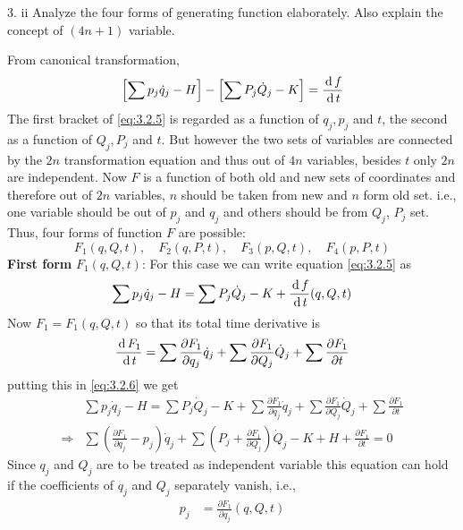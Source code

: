 \documentclass[12pt]{article}
\begin{document}
\begin{prob}{3. ii}
    Analyze the four forms of generating function elaborately. Also explain the concept of \((4n+1)\) variable.
\end{prob}
\begin{soln}
    From canonical transformation,
    \begin{equation}
        \left[ \sum p_j\dot{q}_j-H \right]-\left[ \sum P_j\dot{Q}_j-K \right]=\frac{\,\mathrm{d}\, f}{\,\mathrm{d}\, t} \label{eq:3.2.5}
    \end{equation}
    The first bracket of \eqref{eq:3.2.5} is regarded as a function of \(q_j,p_j\) and \(t\), the second as a function of \(Q_j,P_j\) and \(t\). But however the two sets of variables are connected by the \(2n\) transformation equation and thus out of \(4n\) variables, besides \(t\) only \(2n\) are independent. Now \(F\) is a function of both old and new sets of coordinates and therefore out of \(2n\) variables, \(n\) should be taken from new and \(n\) form old set. i.e., one variable should be out of \(p_j\) and \(q_j\) and others should be from \(Q_j\), \(P_j\) set. Thus, four forms of function \(F\) are possible:
    \[
        F_1(q,Q,t),\quad F_2(q,P,t),\quad F_3(p,Q,t),\quad F_4(p,P,t)
    \]
    \textbf{First form} \(F_1(q,Q,t)\): For this case we can write equation \eqref{eq:3.2.5} as
    \begin{equation}
        \sum p_j\dot{q}_j-H =\sum P_j\dot{Q}_j-K+\frac{\,\mathrm{d}\, f}{\,\mathrm{d}\, t}(q,Q,t) \label{eq:3.2.6}
    \end{equation} 
    Now \(F_1=F_1(q,Q,t)\) so that its total time derivative is
    \[\frac{\,\mathrm{d}\, F_1}{\,\mathrm{d}\, t}=\sum \frac{\partial F_1}{\partial q_j}\dot{q}_j+\sum \frac{\partial F_1}{\partial Q_j}\dot{Q}_j+\sum \frac{\partial F_1}{\partial t}\]
    putting this in \eqref{eq:3.2.6} we get
    \begin{align*}
        &\sum p_j\dot{q}_j-H =\sum P_j\dot{Q}_j-K+\sum \frac{\partial F_1}{\partial q_j}\dot{q}_j+\sum \frac{\partial F_1}{\partial Q_j}\dot{Q}_j+\sum \frac{\partial F_1}{\partial t}\\
        \Rightarrow& \sum \left( \frac{\partial F_1}{\partial q_j}-p_j \right)\dot{q}_j+\sum \left( P_j+\frac{\partial F_1}{\partial Q_j} \right)\dot{Q}_j-K+H+\frac{\partial F_1}{\partial t}=0
    \end{align*}
    Since \(q_j\) and \(Q_j\) are to be treated as independent variable this equation can hold if the coefficients of \(q_j\) and \(Q_j\) separately vanish, i.e.,
    \begin{align*}
        p_j&=\frac{\partial F_1}{\partial q_j}(q,Q,t)\\

\end{align*}
\end{soln}
\end{document}
